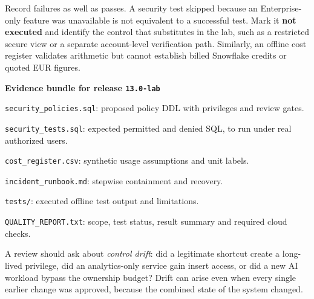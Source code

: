 \documentclass[11pt,twoside]{article}
\begin{document}
Record failures as well as passes. A security test skipped because an Enterprise-only feature was unavailable is not equivalent to a successful test. Mark it \textbf{not executed} and identify the control that substitutes in the lab, such as a restricted secure view or a separate account-level verification path. Similarly, an offline cost register validates arithmetic but cannot establish billed Snowflake credits or quoted EUR figures.
\begin{whitebox}\textbf{Evidence bundle for release \texttt{13.0-lab}}\par
\texttt{security\_policies.sql}: proposed policy DDL with privileges and review gates.\par
\texttt{security\_tests.sql}: expected permitted and denied SQL, to run under real authorized users.\par
\texttt{cost\_register.csv}: synthetic usage assumptions and unit labels.\par
\texttt{incident\_runbook.md}: stepwise containment and recovery.\par
\texttt{tests/}: executed offline test output and limitations.\par
\texttt{QUALITY\_REPORT.txt}: scope, test status, result summary and required cloud checks.
\end{whitebox}
A review should ask about \emph{control drift}: did a legitimate shortcut create a long-lived privilege, did an analytics-only service gain insert access, or did a new AI workload bypass the ownership budget? Drift can arise even when every single earlier change was approved, because the combined state of the system changed.
\end{document}
